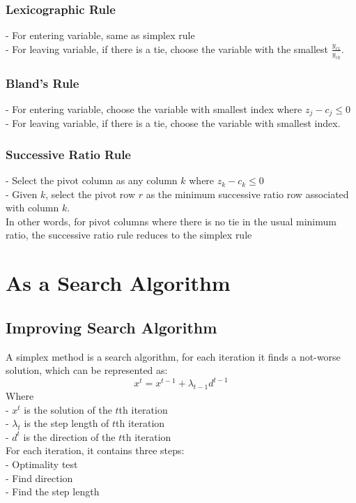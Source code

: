 					\subsubsection{Lexicographic Rule}
						- For entering variable, same as simplex rule\\
						- For leaving variable, if there is a tie, choose the variable with the smallest $\frac{y_{r1}}{y_{rk}}$.

					\subsubsection{Bland's Rule}
						- For entering variable, choose the variable with smallest index where $z_j - c_j \le 0$\\
						- For leaving variable, if there is a tie, choose the variable with smallest index.

					\subsubsection{Successive Ratio Rule}
						- Select the pivot column as any column $k$ where $z_k - c_k \le 0$\\
						- Given $k$, select the pivot row $r$ as the minimum successive ratio row associated with column $k$.\\
						In other words, for pivot columns where there is no tie in the usual minimum ratio, the successive ratio rule reduces to the simplex rule

			\section{As a Search Algorithm}
				\subsection{Improving Search Algorithm}
					A simplex method is a search algorithm, for each iteration it finds a not-worse solution, which can be represented as:\\
					\begin{equation}x^t = x^{t-1}+\lambda_{t-1}d^{t-1}  \end{equation}
					Where\\
					- $x^t$ is the solution of the $t$th iteration\\
					- $\lambda_t$ is the step length of $t$th iteration\\
					- $d^t$ is the direction of the $t$th iteration\\
					For each iteration, it contains three steps:\\
					- Optimality test\\
					- Find direction\\
					- Find the step length

